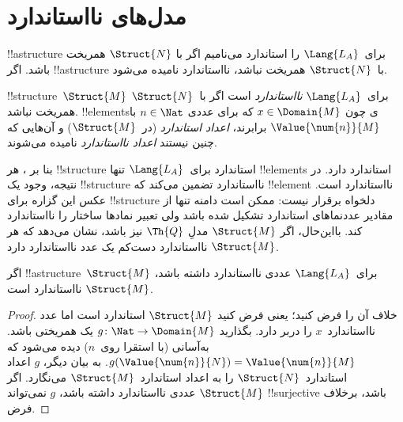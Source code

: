 \documentclass[../../../include/open-logic-section]{subfiles}
\begin{document}
\section{مدل‌های نااستاندارد}

\begin{explain}
!!a{structure} برای~$\Lang{L_A}$ را استاندارد می‌نامیم اگر با
$\Struct{N}$ همریخت باشد. اگر !!a{structure} با~$\Struct{N}$ همریخت
نباشد، نااستاندارد نامیده می‌شود.
\end{explain}

\begin{defn}
!!{structure}~$\Struct{M}$ برای~$\Lang{L_A}$
\emph{نااستاندارد} است اگر با~$\Struct{N}$ همریخت نباشد.
!!{element}sی چون $x \in \Domain{M}$ که برای عددی $n \in \Nat$ با
$\Value{\num{n}}{M}$ برابرند،
\emph{اعداد استاندارد} (در~$\Struct{M}$) و آن‌هایی که چنین نیستند
\emph{اعداد نااستاندارد} نامیده می‌شوند.
\end{defn}

\begin{explain}
بنا بر
، هر !!{structure} استاندارد
برای~$\Lang{L_A}$ تنها !!{element}s استاندارد دارد. در نتیجه، وجود یک
!!{structure} نااستاندارد تضمین می‌کند که !!{element} نااستاندارد
است. عکس این گزاره برای !!{structure} دلخواه برقرار نیست: ممکن است
دامنه تنها از مقادیر عددنماهای استاندارد تشکیل شده باشد ولی تعبیر
نمادها ساختار را نااستاندارد کند. بااین‌حال، اگر $\Struct{M}$ مدلِ
$\Th{Q}$ نیز باشد،
 نشان می‌دهد که هر $\Struct{M}$
نااستاندارد دست‌کم یک عدد نااستاندارد دارد.
\end{explain}

\begin{prop}
اگر !!a{structure}~$\Struct{M}$ برای~$\Lang{L_A}$ عددی نااستاندارد
داشته باشد، $\Struct{M}$ نااستاندارد است.
\end{prop}

\begin{proof}
خلاف آن را فرض کنید؛ یعنی فرض کنید $\Struct{M}$ استاندارد است اما عدد
نااستاندارد~$x$ را دربر دارد. بگذارید
$g\colon \Nat \to \Domain{M}$ یک همریختی باشد. به‌آسانی (با استقرا
روی~$n$) دیده می‌شود که
$g(\Value{\num{n}}{N}) = \Value{\num{n}}{M}$. به بیان دیگر، $g$
اعداد استاندارد~$\Struct{N}$ را به اعداد استاندارد~$\Struct{M}$
می‌نگارد. اگر $\Struct{M}$ عددی نااستاندارد داشته باشد، $g$ نمی‌تواند
!!{surjective} باشد، برخلاف فرض.
\end{proof}
\end{document}
